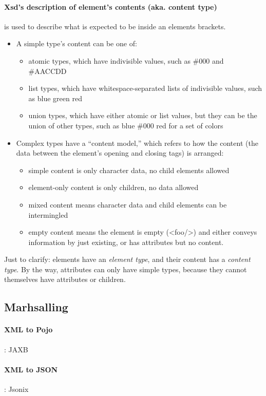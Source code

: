 \paragraph{Xsd's description of element's contents (aka. content type)} is used to describe what is expected to be inside an elements brackets. 
\begin{itemize}
    \item A simple type’s content can be one of:
        \begin{itemize}
            \item atomic types, which have indivisible values, such as \#000 and \#AACCDD
            \item list types, which have whitespace-separated lists of indivisible values, such as blue green red
            \item union types, which have either atomic or list values, but they can be the union of other types, such as blue \#000 red for a set of colors
        \end{itemize}
    \item Complex types have a “content model,” which refers to how the content (the data between the element’s opening and closing tags) is arranged:
        \begin{itemize}
            \item simple content is only character data, no child elements allowed
            \item element-only content is only children, no data allowed
            \item mixed content means character data and child elements can be intermingled
            \item empty content means the element is empty (<foo/>) and either conveys information by just existing, or has attributes but no content.
        \end{itemize}
\end{itemize}

Just to clarify: elements have an \emph{element type}, and their content has a \emph{content type}. By the way, attributes can only have simple types, because they cannot themselves have attributes or children.

\subsection{Marhsalling}
\paragraph{XML to Pojo}: JAXB
\paragraph{XML to JSON}: Jsonix
